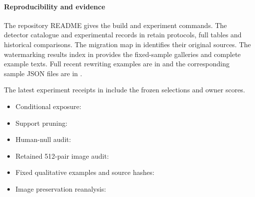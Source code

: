 \paragraph{Reproducibility and evidence}
The repository README gives the build and experiment commands. The detector catalogue and experimental records in  retain protocols, full tables and historical comparisons. The migration map in  identifies their original sources. The watermarking results index in  provides the fixed-sample galleries and complete example texts. Full recent rewriting examples are in  and the corresponding sample JSON files are in .

The latest experiment receipts in  include the frozen selections and owner scores.
\begin{itemize}
\item Conditional exposure: 
\item Support pruning: 
\item Human-null audit: 
\item Retained 512-pair image audit: 
\item Fixed qualitative examples and source hashes: 
\item Image preservation reanalysis: 
\end{itemize}

